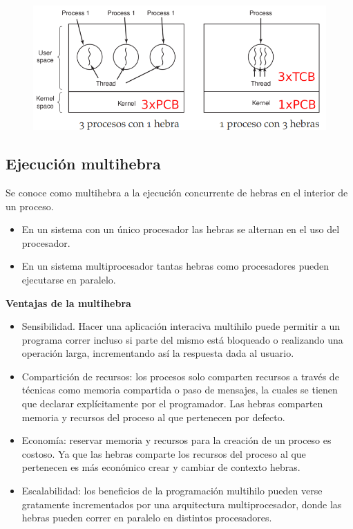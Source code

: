 \documentclass{article}
\begin{document}
\begin{figure}[h]
\centering
\includegraphics[scale=1,width=\textwidth]{comparativathread.png}
\end{figure}

\subsection{Ejecución multihebra}
Se conoce como multihebra a la ejecución concurrente de hebras en el interior de un proceso. 
\begin{itemize}
\item En un sistema con un único procesador las hebras se alternan en el uso del procesador.

\item En un sistema multiprocesador tantas hebras como procesadores pueden ejecutarse en paralelo.
\end{itemize}

\textbf{Ventajas de la multihebra}
\begin{itemize}
\item Sensibilidad. Hacer una aplicación interaciva multihilo puede permitir a un programa correr incluso si parte del mismo está bloqueado o realizando una operación larga, incrementando así la respuesta dada al usuario.

\item Compartición de recursos: los procesos solo comparten recursos a través de técnicas como memoria compartida o paso de mensajes, la cuales se tienen que declarar explícitamente por el programador. Las hebras comparten memoria y recursos del proceso al que pertenecen por defecto.

\item Economía: reservar memoria y recursos para la creación de un proceso es costoso. Ya que las hebras comparte los recursos del proceso al que pertenecen es más económico crear y cambiar de contexto hebras.

\item Escalabilidad: los beneficios de la programación multihilo pueden verse gratamente incrementados por una arquitectura multiprocesador, donde las hebras pueden correr en paralelo en distintos procesadores.
\end{itemize}
\end{document}
